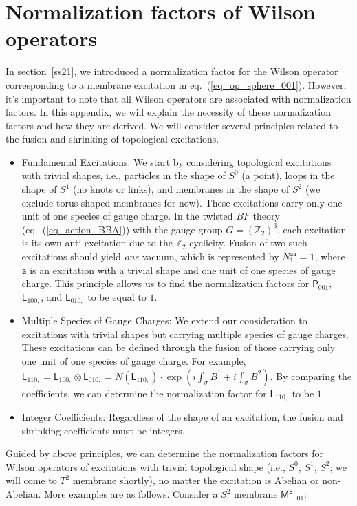 \documentclass[11pt,nofootinbib,preprint]{revtex4-1}
\def\Z{\mathbb{Z}}
\begin{document}
\appendix
\section{Normalization factors of Wilson operators\label{ap_normalization_factors}}
In section~\ref{ss21}, we introduced a normalization factor for the Wilson operator corresponding to a membrane excitation in eq.~(\ref{eq_op_sphere_001}). However, it's important to note that all Wilson operators are associated with normalization factors. In this appendix, we will explain the necessity of these normalization factors and how they are derived. We will consider several principles related to the fusion and shrinking of topological excitations.
\begin{itemize}
	\item [1] Fundamental Excitations: We start by considering topological excitations with trivial shapes, i.e., particles in the shape of $S^0$ (a point), loops in the shape of $S^1$ (no knots or links), and membranes in the shape of $S^2$ (we exclude torus-shaped membranes for now). These excitations carry only one unit of one species of gauge charge. In the twisted $BF$ theory (eq.~(\ref{eq_action_BBA})) with the gauge group $G=\left(\mathbb{Z}_2\right)^3$, each excitation is its own anti-excitation due to the $\Z_2$ cyclicity. Fusion of two such excitations should yield \emph{one} vacuum, which is represented by $N^{\mathsf{a}\mathsf{a}}_{\mathsf{1}}=1$, where $\mathsf{a}$ is an excitation with a trivial shape and one unit of one species of gauge charge. This principle allows us to find the normalization factors for $\mathsf{P}_{001}$, $\mathsf{L}_{100,}$, and $\mathsf{L}_{010,}$ to be equal to $1$.
	
	\item [2] Multiple Species of Gauge Charges: We extend our consideration to excitations with trivial shapes but carrying multiple species of gauge charges. These excitations can be defined through the fusion of those carrying only one unit of one species of gauge charge. For example,  $\mathsf{L}_{110,}=\mathsf{L}_{100,} \otimes \mathsf{L}_{010,}=N\left(\mathsf{L}_{110,}\right)\cdot \exp\left(i\int_{\sigma} B^1 +i \int_{\sigma} B^2\right)$. By comparing the coefficients, we can determine the normalization factor for $\mathsf{L}_{110,}$ to be $1$. 
	
	\item [3] Integer Coefficients: Regardless of the shape of an excitation, the fusion and shrinking coefficients must be integers.
\end{itemize}
Guided by above principles, we can determine the normalization factors for Wilson operators of excitations with trivial topological shape (i.e., $S^0$, $S^1$, $S^2$; we will come to $T^2$ membrane shortly), no matter the excitation is Abelian or non-Abelian. More examples are as follows. Consider a $S^2$ membrane $\mathsf{M^S}_{001}$: 
\end{document}
